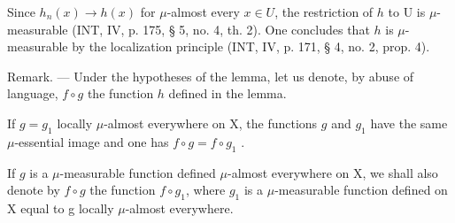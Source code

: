Since \(h_{n}(x) \to h(x)\) for \(\mu\)-almost every \(x \in U\), the restriction of \(h\) to U is \(\mu\)-measurable (INT, IV, p. 175, § 5, no. 4, th. 2). One concludes that \(h\) is \(\mu\)-measurable by the localization principle (INT, IV, p. 171, § 4, no. 2, prop. 4).

Remark. --- Under the hypotheses of the lemma, let us denote, by abuse of language, \(f \circ g\) the function \(h\) defined in the lemma.

If \(g = g_{1}\) locally \(\mu\)-almost everywhere on X, the functions \(g\) and \(g_{1}\) have the same \(\mu\)-essential image and one has \(f \circ g = f \circ g_{1}\) .

If \(g\) is a \(\mu\)-measurable function defined \(\mu\)-almost everywhere on X, we shall also denote by \(f \circ g\) the function \(f \circ g_{1}\), where \(g_{1}\) is a \(\mu\)-measurable function defined on X equal to g locally \(\mu\)-almost everywhere.

